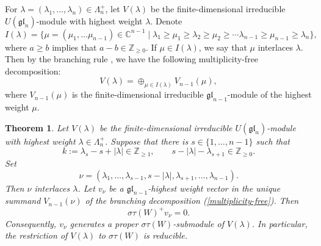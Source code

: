 \documentclass[12pt,a4paper]{amsart}
\newtheorem{theorem}{Theorem}[section]
\numberwithin{equation}{section}
\newcommand{\C}{\mathbb C}
\newcommand{\Z}{\mathbb{Z}}
\def\gl{\mathfrak{gl}}
\def\l{\lambda}
\begin{document}
For $\lambda=(\lambda_1,\ldots,\lambda_n)\in\Lambda_n^+$, let
$V(\lambda)$ be the finite-dimensional irreducible $U(\mathfrak{gl}_n)$-module
with highest weight  $\lambda$.
Denote $$I(\lambda)=\{\mu=(\mu_1,\dots\mu_{n-1})\in \C^{n-1}\mid\l_1\geq \mu_1\geq \l_2\geq \mu_2\geq\cdots \l_{n-1}\geq\mu_{n-1}\geq \l_n\},$$
where $a\geq b$ implies that $a-b\in \Z_{\geq 0}$.
If $\mu\in I(\lambda)$, we say that $\mu$
interlaces $\l$. Then by the branching rule \cite[Theorem 8.1.2]{GW}, we have the following multiplicity-free decomposition:
\begin{equation}\label{multiplicity-free}V(\l)=\oplus_{\mu\in I(\l)}V_{n-1}(\mu),\end{equation}
where $V_{n-1}(\mu)$ is the finite-dimensional irreducible
$\gl_{n-1}$-module of the highest weight $\mu$.


\begin{theorem}\label{sub-mod}
Let 
$V(\lambda)$ be the finite-dimensional irreducible $U(\mathfrak{gl}_n)$-module
with highest weight $\lambda\in\Lambda_n^+$. Suppose that there is
$s\in\{1,\ldots,n-1\}$ such that
\begin{equation}\label{red-condition}
 k:=\lambda_s-s+|\lambda|\in\mathbb Z_{\geq 1},
 \qquad
 s-|\lambda|-\lambda_{s+1}\in\mathbb Z_{\geq 0}.
\end{equation}
Set
\[
 \nu=(\lambda_1,\ldots,\lambda_{s-1},s-|\lambda|,
       \lambda_{s+1},\ldots,\lambda_{n-1}).
\]
Then $\nu$ interlaces $\lambda$. Let $v_\nu$ be a
$\mathfrak{gl}_{n-1}$-highest weight vector in the unique summand
$V_{n-1}(\nu)$ of the branching decomposition
(\ref{multiplicity-free}).
Then
\[
 \sigma\tau(W)^+v_\nu=0.
\]
Consequently, $v_\nu$ generates a proper $\sigma\tau(W)$-submodule of
$V(\lambda)$. In particular, the restriction of $V(\lambda)$ to
$\sigma\tau(W)$ is reducible.
\end{theorem}
\end{document}
